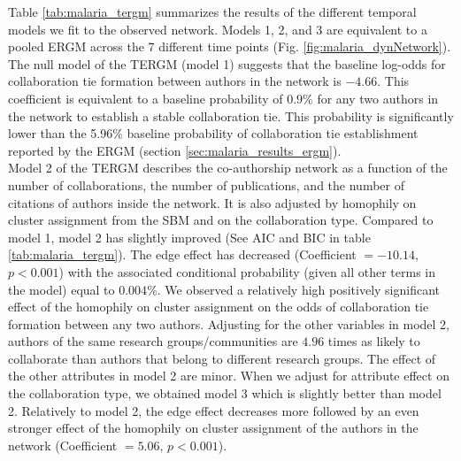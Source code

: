 Table \ref{tab:malaria_tergm} summarizes the results of the different temporal models we fit to the observed network. Models 1, 2, and 3 are equivalent to a pooled ERGM across the 7 different time points (Fig. \ref{fig:malaria_dynNetwork}). The null model of the TERGM (model 1) suggests that the baseline log-odds for collaboration tie formation between authors in the network is $-4.66$. This coefficient is equivalent to a baseline probability of $0.9\%$ for any two authors in the network to establish a stable collaboration tie. This probability is significantly lower than the 5.96\% baseline probability of collaboration tie establishment reported by the ERGM (section \ref{sec:malaria_results_ergm}). \\
Model 2 of the TERGM describes the co-authorship network as a function of the number of collaborations, the number of publications, and the number of citations of authors inside the network. It is also adjusted by homophily on cluster assignment from the SBM and on the collaboration type. Compared to model 1, model 2 has slightly improved (See AIC and BIC in table \ref{tab:malaria_tergm}). The edge effect has decreased (Coefficient $=-10.14$, $p<0.001$) with the associated conditional probability (given all other terms in the model) equal to $0.004\%$. We observed a relatively high positively significant effect of the homophily on cluster assignment on the odds of collaboration tie formation between any two authors. Adjusting for the other variables in model 2, authors of the same research groups/communities are $4.96$ times as likely to collaborate than authors that belong to different research groups. The effect of the other attributes in model 2 are minor. When we adjust for attribute effect on the collaboration type, we obtained model 3 which is slightly better than model 2. Relatively to model 2, the edge effect decreases more followed by an even stronger effect of the homophily on cluster assignment of the authors in the network (Coefficient $=5.06$, $p<0.001$). \\
